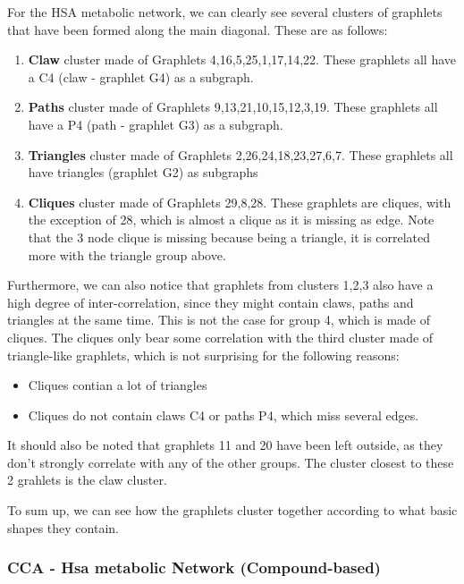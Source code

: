 \documentclass[11pt,a4paper,oneside]{report}
\begin{document}
For the HSA metabolic network, we can clearly see several clusters of graphlets that have been formed along the main diagonal. These are as follows:
\begin{enumerate}
 \item \textbf{Claw} cluster made of Graphlets {4,16,5,25,1,17,14,22}. These graphlets all have a C4 (claw - graphlet G4) as a subgraph.
 \item \textbf{Paths} cluster made of Graphlets {9,13,21,10,15,12,3,19}. These graphlets all have a P4 (path - graphlet G3) as a subgraph.
 \item \textbf{Triangles} cluster made of Graphlets {2,26,24,18,23,27,6,7}. These graphlets all have triangles (graphlet G2) as subgraphs
 \item \textbf{Cliques} cluster made of Graphlets {29,8,28}. These graphlets are cliques, with the exception of 28, which 
 is almost a clique as it is missing as edge. Note that the 3 node clique is missing because being a triangle, it is correlated more with the triangle group above.
 \end{enumerate}
 
Furthermore, we can also notice that graphlets from clusters 1,2,3 also have a high degree of inter-correlation, 
since they might contain claws, paths and triangles at the same time. This is not 
the case for group 4, which is made of cliques. The cliques only bear some 
correlation with the third cluster made of triangle-like graphlets, which is not surprising for the following reasons:
\begin{itemize}
 \item Cliques contian a lot of triangles
 \item Cliques do not contain claws C4 or paths P4, which miss several edges.
\end{itemize}

It should also be noted that graphlets 11 and 20 have been left outside, as they don't strongly correlate with any of the other groups. The cluster closest to these 2 grahlets is the claw cluster.

To sum up, we can see how the graphlets cluster together according to what basic shapes they contain.

\subsubsection*{CCA - Hsa metabolic Network (Compound-based)}

\end{document}
